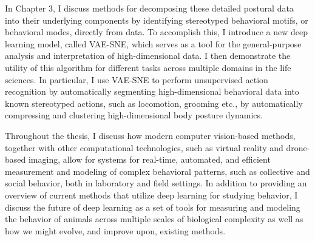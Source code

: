 In Chapter 3, I discuss methods for decomposing these detailed postural data into their underlying components by identifying stereotyped behavioral motifs, or behavioral modes, directly from data. To accomplish this, I introduce a new deep learning model, called VAE-SNE, which serves as a tool for the general-purpose analysis and interpretation of high-dimensional data. I then demonstrate the utility of this algorithm for different tasks across multiple domains in the life sciences. In particular, I use VAE-SNE to perform unsupervised action recognition by automatically segmenting high-dimensional behavioral data into known stereotyped actions, such as locomotion, grooming etc., by automatically compressing and clustering high-dimensional body posture dynamics. 

Throughout the thesis, I discuss how modern computer vision-based methods, together with other computational technologies, such as virtual reality and drone-based imaging, allow for systems for real-time, automated, and efficient measurement and modeling of complex behavioral patterns, such as collective and social behavior, both in laboratory and field settings. In addition to providing an overview of current methods that utilize deep learning for studying behavior, I discuss the future of deep learning as a set of tools for measuring and modeling the behavior of animals across multiple scales of biological complexity as well as how we might evolve, and improve upon, existing methods.
